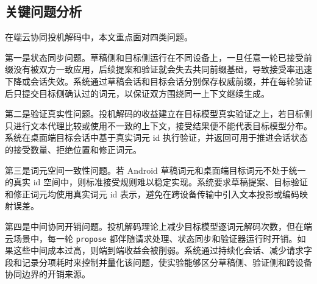 \subsection{关键问题分析}

在端云协同投机解码中，本文重点面对四类问题。

第一是状态同步问题。草稿侧和目标侧运行在不同设备上，一旦任意一轮已接受前缀没有被双方一致应用，后续提案和验证就会失去共同前缀基础，导致接受率迅速下降或会话失效。系统通过草稿会话和目标会话分别保存权威前缀，并在每轮验证后只提交目标侧确认过的词元，以保证双方围绕同一上下文继续生成。

第二是验证真实性问题。投机解码的收益建立在目标模型真实验证之上，若目标侧只进行文本代理比较或使用不一致的上下文，接受结果便不能代表目标模型分布。系统在桌面端目标会话中基于真实词元 id 执行验证，并返回可用于推进会话状态的接受数量、拒绝位置和修正词元。

第三是词元空间一致性问题。若 Android 草稿词元和桌面端目标词元不处于统一的真实 id 空间中，则标准接受规则难以稳定实现\cite{li2024eagle}。系统要求草稿提案、目标验证和修正词元均使用真实词元 id 表示，避免在跨设备传输中引入文本投影或编码映射误差。

第四是中间协同开销问题。投机解码理论上减少目标模型逐词元解码次数，但在端云场景中，每一轮 \texttt{propose} 都伴随请求处理、状态同步和验证器运行时开销。如果这些中间成本过高，则端到端收益会被削弱。系统通过持续化会话、减少请求字段和记录分项耗时来控制并量化该问题，使实验能够区分草稿侧、验证侧和跨设备协同边界的开销来源。
